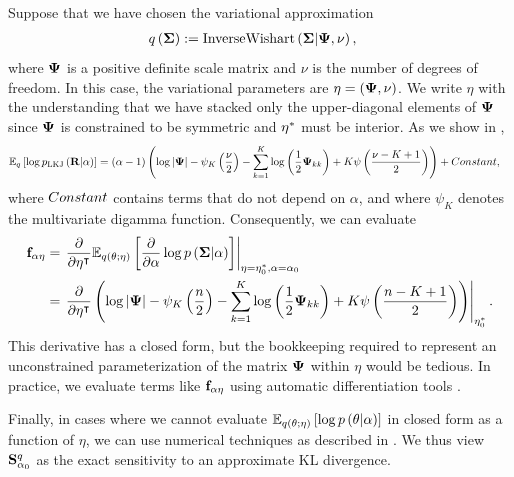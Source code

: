 \documentclass{article}\usepackage[]{graphicx}\usepackage[]{color}
\theoremstyle{definition}
\theoremstyle{plain}
\theoremstyle{plain}
\theoremstyle{plain}
\theoremstyle{definition}
\theoremstyle{plain}
\theoremstyle{plain}
\begin{document}
Suppose that we have chosen the variational approximation
\begin{align*}
q\left(\boldsymbol{\Sigma}\right) & :=\textrm{InverseWishart}\left(\boldsymbol{\Sigma}\vert\boldsymbol{\Psi},\nu\right),
\end{align*}
where $\boldsymbol{\Psi}$ is a positive definite scale matrix and $\nu$
is the number of degrees of freedom. In this case, the variational parameters
are $\eta=\left(\boldsymbol{\Psi},\nu\right)$. We write $\eta$ with the understanding that
we have stacked only the upper-diagonal elements of $\boldsymbol{\Psi}$
since $\boldsymbol{\Psi}$ is constrained to be symmetric and $\eta^{*}$ must
be interior. As we show in ,
\begin{align*}
\mathbb{E}_{q}\left[\log p_{\mathrm{LKJ}}\left(\mathbf{R}\vert\alpha\right)\right] &
    =\left(\alpha-1\right)\left(\log\left|\boldsymbol{\Psi}\right| -
    \psi_{K}\left(\frac{\nu}{2}\right) -
    \sum_{k=1}^{K}\log\left(\frac{1}{2}\boldsymbol{\Psi}_{kk}\right)+
    K\psi\left(\frac{\nu-K+1}{2}\right)\right)+Constant,
\end{align*}
where $Constant$ contains terms that do not depend on $\alpha$,
and where $\psi_{K}$ denotes the multivariate digamma function. Consequently,
we can evaluate
\begin{align}
\mathbf{f}_{\alpha\eta} & =\left.\frac{\partial}{\partial\eta^{\intercal}}
\mathbb{E}_{q\left(\theta;\eta\right)}\left[\frac{\partial}{\partial\alpha}
\log p\left(\boldsymbol{\Sigma}\vert\alpha\right)\right]\right|_{\eta=\eta_{0}^{*},\alpha =
    \alpha_{0}}\nonumber \\
 & =\left.\frac{\partial}{\partial\eta^{\intercal}}
    \left(\log\left|\boldsymbol{\Psi}\right|-\psi_{K}\left(
        \frac{n}{2}\right)-\sum_{k=1}^{K}
        \log\left(\frac{1}{2}\boldsymbol{\Psi}_{kk}\right)+
        K\psi\left(\frac{n-K+1}{2}\right)\right)\right|_{\eta_{0}^{*}}.
        \label{eq:lkj_prior_vb}
\end{align}
This derivative has a closed form, but the bookkeeping required
to represent an unconstrained parameterization of the matrix $\boldsymbol{\Psi}$
within $\eta$ would be tedious. In practice, we evaluate terms like
$\mathbf{f}_{\alpha\eta}$ using automatic differentiation tools \citep{baydin:2015:autodiff}.

Finally, in cases where we cannot evaluate $\mathbb{E}_{q\left(\theta;\eta\right)}\left[\log p\left(\theta\vert\alpha\right)\right]$
in closed form as a function of $\eta$, we can use numerical techniques
as described in . We thus view
$\mathbf{S}_{\alpha_{0}}^{q}$ as the exact sensitivity to an approximate KL divergence.
\end{document}
